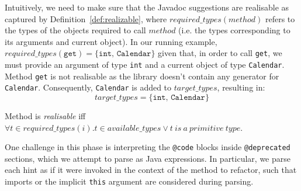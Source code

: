 \documentclass[sigconf,review,anonymous]{acmart}
\begin{document}
Intuitively, we need to make sure that the Javadoc suggestions
are realisable as captured by Definition~\ref{def:realizable}, where 
$required\_types(method)$ refers to the types of the objects required to call $method$ (i.e. the types corresponding to its arguments and current object).
In our running example, $required\_types(\texttt{get}) = \{\texttt{int, Calendar}\}$
given that, in order to call \texttt{get}, we must provide an argument of type \texttt{int} and a current object of type \texttt{Calendar}.
Method \texttt{get} is not realisable as the library doesn't contain any generator for \texttt{Calendar}.
Consequently, \texttt{Calendar} is added to $target\_types$, resulting in:
$$target\_types = \{\texttt{int, Calendar}\}$$

\begin{definition}\label{def:realizable}
Method  is {\em realisable} iff $\forall t \in required\_types(i). t \in available\_types \vee t~is~a~primitive~type$.
\end{definition}



One challenge in this phase is interpreting the
\texttt{@code} blocks inside \texttt{@deprecated} sections, which 
we attempt to parse as Java expressions. In particular, we parse each hint as if it were invoked in the context of
the method to refactor, such that imports or the implicit \texttt{this} argument
are considered during parsing.
\end{document}
